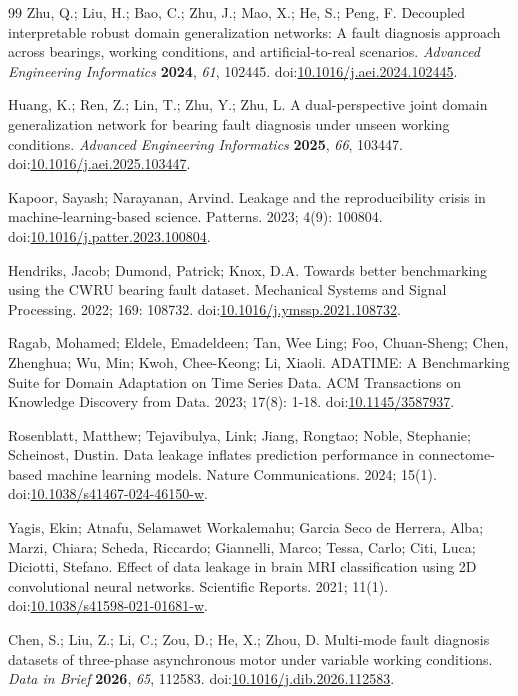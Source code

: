 \documentclass[machines,article,submit,oneauthor]{Definitions/mdpi}
\begin{document}
\begin{thebibliography}{99}
 Zhu, Q.; Liu, H.; Bao, C.; Zhu, J.; Mao, X.; He, S.; Peng, F. Decoupled interpretable robust domain generalization networks: A fault diagnosis approach across bearings, working conditions, and artificial-to-real scenarios. \textit{Advanced Engineering Informatics} \textbf{2024}, \textit{61}, 102445. doi:\url{10.1016/j.aei.2024.102445}.

 Huang, K.; Ren, Z.; Lin, T.; Zhu, Y.; Zhu, L. A dual-perspective joint domain generalization network for bearing fault diagnosis under unseen working conditions. \textit{Advanced Engineering Informatics} \textbf{2025}, \textit{66}, 103447. doi:\url{10.1016/j.aei.2025.103447}.

 Kapoor, Sayash; Narayanan, Arvind. Leakage and the reproducibility crisis in machine-learning-based science. Patterns. 2023; 4(9): 100804. doi:\url{10.1016/j.patter.2023.100804}.

 Hendriks, Jacob; Dumond, Patrick; Knox, D.A. Towards better benchmarking using the CWRU bearing fault dataset. Mechanical Systems and Signal Processing. 2022; 169: 108732. doi:\url{10.1016/j.ymssp.2021.108732}.

 Ragab, Mohamed; Eldele, Emadeldeen; Tan, Wee Ling; Foo, Chuan-Sheng; Chen, Zhenghua; Wu, Min; Kwoh, Chee-Keong; Li, Xiaoli. ADATIME: A Benchmarking Suite for Domain Adaptation on Time Series Data. ACM Transactions on Knowledge Discovery from Data. 2023; 17(8): 1-18. doi:\url{10.1145/3587937}.

 Rosenblatt, Matthew; Tejavibulya, Link; Jiang, Rongtao; Noble, Stephanie; Scheinost, Dustin. Data leakage inflates prediction performance in connectome-based machine learning models. Nature Communications. 2024; 15(1). doi:\url{10.1038/s41467-024-46150-w}.

 Yagis, Ekin; Atnafu, Selamawet Workalemahu; Garcia Seco de Herrera, Alba; Marzi, Chiara; Scheda, Riccardo; Giannelli, Marco; Tessa, Carlo; Citi, Luca; Diciotti, Stefano. Effect of data leakage in brain MRI classification using 2D convolutional neural networks. Scientific Reports. 2021; 11(1). doi:\url{10.1038/s41598-021-01681-w}.

 Chen, S.; Liu, Z.; Li, C.; Zou, D.; He, X.; Zhou, D. Multi-mode fault diagnosis datasets of three-phase asynchronous motor under variable working conditions. \textit{Data in Brief} \textbf{2026}, \textit{65}, 112583. doi:\url{10.1016/j.dib.2026.112583}.


\end{thebibliography}
\end{document}
